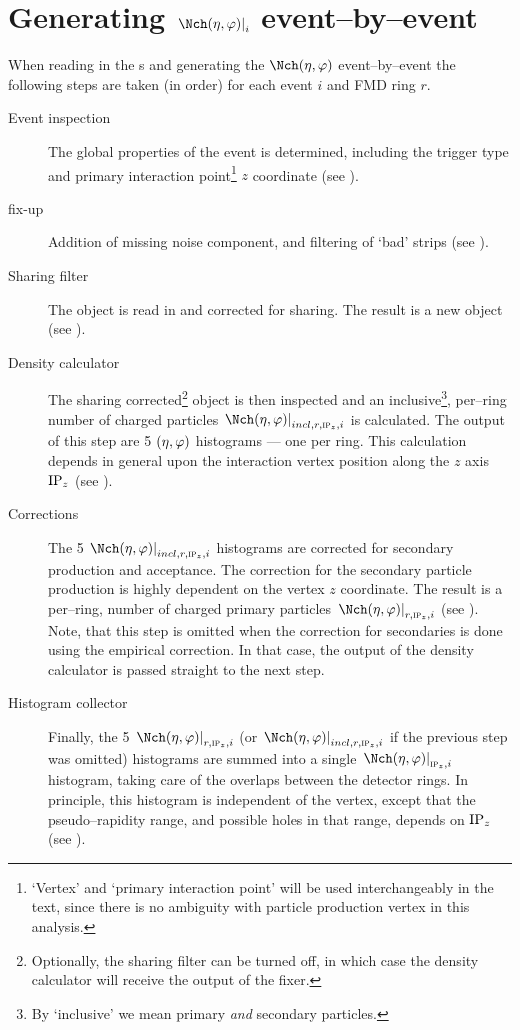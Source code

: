 \section{Generating $\dndetadphi[i]$ event--by--event}
\label{sec:gen_aod}

When reading in the \ESD{}s and generating the $\dndetadphi$
event--by--event the following steps are taken (in order) for each
event $i$ and FMD ring $r$.
\begin{description}
\item[Event inspection] The global properties of the event is
  determined, including the trigger type and primary interaction
  point\footnote{`Vertex' and `primary interaction point' will be used
    interchangeably in the text, since there is no ambiguity with
    particle production vertex in this analysis.} $z$ coordinate (see
  ).
\item[\ESD{} fix-up] Addition of missing noise component, and filtering
  of `bad' strips (see ).
\item[Sharing filter] The \ESD{} object is read in and corrected for
  sharing.  The result is a new \ESD{} object (see
  ).
\item[Density calculator] The sharing corrected\footnote{Optionally,
    the sharing filter can be turned off, in which case the density
    calculator will receive the output of the \ESD{} fixer.} \ESD{}
  object is then inspected and an inclusive\footnote{By `inclusive' we
    mean primary \emph{and} secondary particles.}, per--ring number of
  charged particles $\dndetadphi[incl,r,\subIPz{},i]$ is calculated.
  The output of this step are 5 $(\eta,\varphi)$ histograms --- one per
  \FMD{} ring.  This calculation depends in general upon the
  interaction vertex position along the $z$ axis $\IPz{}$ (see
  ).
\item[Corrections] The 5 $\dndetadphi[incl,r,\subIPz{},i]$ histograms
  are corrected for secondary production and acceptance.  The
  correction for the secondary particle production is highly dependent
  on the vertex $z$ coordinate.  The result is a per--ring, number of
  charged primary particles $\dndetadphi[r,\subIPz{},i]$ (see
  ).  Note, that this step is omitted when
  the correction for secondaries is done using the empirical
  correction.   In that case, the output of the density calculator is
  passed straight to the next step. 
\item[Histogram collector] Finally, the 5 $\dndetadphi[r,\subIPz{},i]$
  (or $\dndetadphi[incl,r,\subIPz{},i]$ if the previous step was
  omitted) histograms are summed into a single
  $\dndetadphi[\subIPz{},i]$ histogram, taking care of the overlaps
  between the detector rings.  In principle, this histogram is
  independent of the vertex, except that the pseudo--rapidity range,
  and possible holes in that range, depends on $\IPz{}$ (see
  ).
\end{description}


